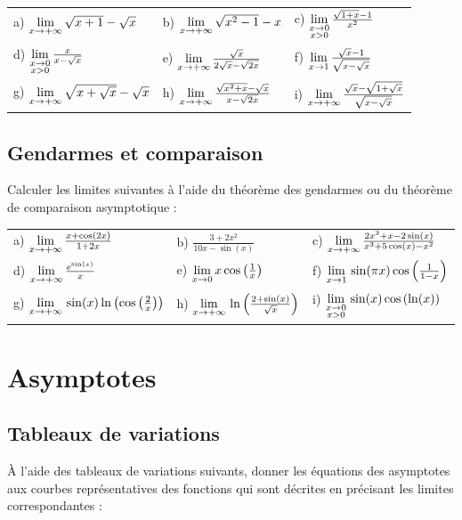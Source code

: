\documentclass[oneside,12pt]{book}          %
\begin{document}
\begin{tabular}{p{} p{} p{}}
    a) ${\lim\limits_{x\to +\infty}}\, \sqrt{x+1}-\sqrt{x}$ & b) ${\lim\limits_{x\to +\infty}}\, \sqrt{x^2-1}-x$ & c) ${\lim\limits_{\substack{x\to0\\x>0}}}\, \frac{\sqrt{1+x}-1}{x^2}$ \\
    d) ${\lim\limits_{\substack{x\to0\\x>0}}}\,\frac{x}{x-\sqrt{x}}$ & e) ${\lim\limits_{x\to +\infty}}\, \frac{\sqrt{x}}{2\sqrt{x}-\sqrt{2x}}$ & f)  ${\lim\limits_{\substack{x\to1}}}\,\frac{\sqrt{x}-1}{\sqrt{x-\sqrt{x}}}$ \\
    g) ${\lim\limits_{x\to +\infty}}\, \sqrt{x+\sqrt{x}}-\sqrt{x}$ & h) ${\lim\limits_{x\to +\infty}}\, \frac{\sqrt{x^2+x}-\sqrt{x}}{x-\sqrt{2x}}$ & i) ${\lim\limits_{x\to +\infty}}\, \frac{\sqrt{x}-\sqrt{1+\sqrt{x}}}{\sqrt{x-\sqrt{x}}}$
\end{tabular}



\subsection{Gendarmes et comparaison}
Calculer les limites suivantes à l'aide du théorème des gendarmes ou du théorème de comparaison asymptotique :

\begin{tabular}{p{} p{} p{}}
	a) ${\lim\limits_{x\to +\infty}}\,\frac{x+\cos(2x)}{1+2x}$ & b) $\frac{3+2x^2}{10x-\sin(x)}$ & c) ${\lim\limits_{x\to +\infty}}\, \frac{2x^3+x-2\sin(x)}{x^3+5\cos(x)-x^2}$\\
    d) ${\lim\limits_{x\to +\infty}}\, \frac{e^{\sin(x)}}{x}$ & e) ${\lim\limits_{\substack{x\to0}}}\,x\cos\left(\frac{1}{x}\right)$ & f) ${\lim\limits_{\substack{x\to1}}}\, \sin(\pi x)\cos\left(\frac{1}{1-x}\right)$\\
    g) ${\lim\limits_{x\to +\infty}}\,\sin(x)\ln\left(\cos\left(\frac{2}{x}\right)\right)$ & h) ${\lim\limits_{x\to +\infty}}\,\ln\left(\frac{2+\sin(x)}{\sqrt{x}}\right)$ & i) ${\lim\limits_{\substack{x\to0\\x>0}}}\,\sin(x)\cos\left(\ln(x)\right)$
\end{tabular}



\section{Asymptotes}

\subsection{Tableaux de variations}
À l'aide des tableaux de variations suivants, donner les équations des asymptotes aux courbes représentatives des fonctions qui sont décrites en précisant les limites correspondantes :\\
\end{document}
